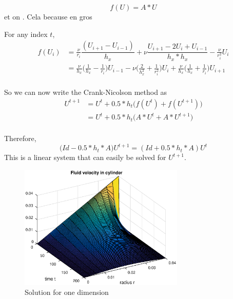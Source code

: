 

\newline
{}
$$f(U)=A*U$$ et on . Cela because en gros

For any index $t$,
\begin{align*}
f(U_i ) &= \frac{\nu}{r_i}\dfrac{(U_{i+1}-U_{i-1})}{h_x}+\nu\dfrac{U_{i+1}-2U_{i}+U_{i-1}}{h_{x}*h_{x}} -\frac{\nu}{r_{i}^2}U_{i}\\
&= \frac{\nu}{h_x}\Big( \frac{1}{h_x} - \frac{1}{r_i}\Big)U_{i-1} 
 -\nu\Big( \frac{2}{h_{x}^2} + \frac{1}{r_{i}^{2}}\Big)U_{i}
+ \frac{\nu}{h_x}\Big( \frac{1}{h_x} + \frac{1}{r_i}\Big)U_{i+1}\\
\end{align*} 

So we can now write the Crank-Nicolson method as
\begin{align*}
U^{t+1} &= U^{t} + 0.5*h_{t}\Big(f(U^{t}) + f(U^{t+1})\Big)\\
  &= U^{t} + 0.5*h_{t}\Big(A*U^{t} + A*U^{t+1}\Big)\\
\end{align*}

Therefore,
$$\Big(Id -0.5*h_{t}*A\big)U^{t+1} = (Id + 0.5*h_{t}*A)U^{t}$$
This is a linear system that can easily be solved for $U^{t+1}$.\newline








\begin{figure}[!h]
\centering
\includegraphics[width = 0.7\textwidth]{./dim1.eps}
\caption{Solution for one dimension}
\label{fig:dim1sol}
\end{figure}
\FloatBarrier
